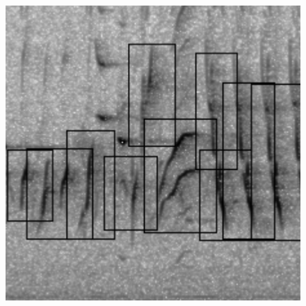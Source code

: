 \documentclass[t, xcolor={dvipsnames}]{beamer}
\begin{document}
\begin{frame}[fragile]
\begin{figure}[!tbp]
\begin{minipage}[c]{0.3\textwidth}
      \end{minipage}
      \hfill
      \begin{minipage}[c]{0.3\textwidth}
        \includegraphics[width=\textwidth]{img/detected-features}
      \end{minipage}
    \end{figure}
\end{frame}
\end{document}
